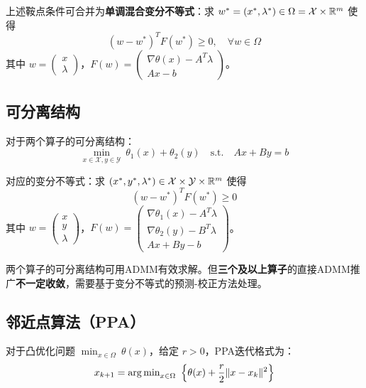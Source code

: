\begin{theorem}[等价变分不等式]
上述鞍点条件可合并为\textbf{单调混合变分不等式}：求 $w^* = (x^*, \lambda^*) \in \Omega = \mathcal{X} \times \mathbb{R}^m$ 使得
\[
(w - w^*)^T F(w^*) \geq 0,\quad \forall w \in \Omega
\]
其中 $w = \begin{pmatrix} x \\ \lambda \end{pmatrix}$，$F(w) = \begin{pmatrix} \nabla \theta(x) - A^T \lambda \\ Ax - b \end{pmatrix}$。
\end{theorem}

\subsection{可分离结构}

对于两个算子的可分离结构：
\[
\min_{x \in \mathcal{X}, y \in \mathcal{Y}}\ \theta_1(x) + \theta_2(y)\quad \text{s.t.}\quad Ax + By = b
\]

对应的变分不等式：求 $(x^*, y^*, \lambda^*) \in \mathcal{X} \times \mathcal{Y} \times \mathbb{R}^m$ 使得
\[
(w - w^*)^T F(w^*) \geq 0
\]
其中 $w = \begin{pmatrix} x \\ y \\ \lambda \end{pmatrix}$，$F(w) = \begin{pmatrix} \nabla \theta_1(x) - A^T \lambda \\ \nabla \theta_2(y) - B^T \lambda \\ Ax + By - b \end{pmatrix}$。

\begin{notebox}[ADMM的收敛性]
两个算子的可分离结构可用ADMM有效求解。但\textbf{三个及以上算子}的直接ADMM推广\textbf{不一定收敛}，需要基于变分不等式的预测-校正方法处理。
\end{notebox}

\subsection{邻近点算法（PPA）}

\begin{definition}[邻近点算法]
对于凸优化问题 $\min_{x \in \Omega}\ \theta(x)$，给定 $r > 0$，PPA迭代格式为：
\[
x_{k+1} = \argmin_{x \in \Omega}\ \left\{\theta(x) + \frac{r}{2}\|x - x_k\|^2\right\}
\]
\end{definition}


